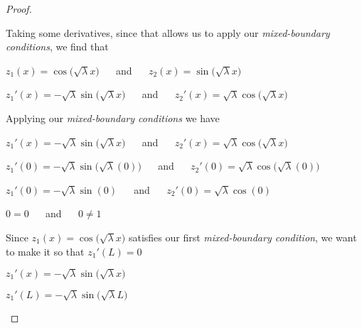 \documentclass[executivepaper]{article}
\begin{document}
\begin{flushleft}
\begin{proof}
\begin{center}
\end{center}

Taking some derivatives, since that allows us to apply our \textit{mixed-boundary conditions}, we find that

\begin{center}

$z_{1}(x)=\cos\bigg(\sqrt{\lambda} x\bigg)$ $\quad$ and $\quad$ $z_{2}(x)=\sin\bigg(\sqrt{\lambda} x\bigg)$

\vspace{2mm}

$z_{1}'(x)=-\sqrt{\lambda} \sin\bigg(\sqrt{\lambda} x\bigg)$ $\quad$ and $\quad$ $z_{2}'(x)=\sqrt{\lambda} \cos\bigg(\sqrt{\lambda} x\bigg)$

\end{center}

Applying our \textit{mixed-boundary conditions} we have

\begin{center}

$z_{1}'(x)=-\sqrt{\lambda} \sin\bigg(\sqrt{\lambda} x\bigg)$ $\quad$ and $\quad$ $z_{2}'(x)=\sqrt{\lambda} \cos\bigg(\sqrt{\lambda} x\bigg)$

\vspace{2mm}

$z_{1}'(0)=-\sqrt{\lambda} \sin\bigg(\sqrt{\lambda} (0)\bigg)$ $\quad$ and $\quad$ $z_{2}'(0)=\sqrt{\lambda} \cos\bigg(\sqrt{\lambda} (0)\bigg)$

\vspace{2mm}

$z_{1}'(0)=-\sqrt{\lambda} \sin(0)$ $\quad$ and $\quad$ $z_{2}'(0)=\sqrt{\lambda} \cos(0)$

\vspace{2mm}

$0=0$ $\quad$ and $\quad$ $0 \neq 1$

\end{center}

Since $z_{1}(x)=\cos\bigg(\sqrt{\lambda} x\bigg)$ satisfies our first \textit{mixed-boundary condition}, we want to make it so that $z_{1}'(L)=0$

\begin{center}

$z_{1}'(x)=-\sqrt{\lambda} \sin\bigg(\sqrt{\lambda} x\bigg)$

\vspace{2mm}

$z_{1}'(L)=-\sqrt{\lambda} \sin\bigg(\sqrt{\lambda} L\bigg)$

\vspace{2mm}


\end{center}
\end{proof}
\end{flushleft}
\end{document}
